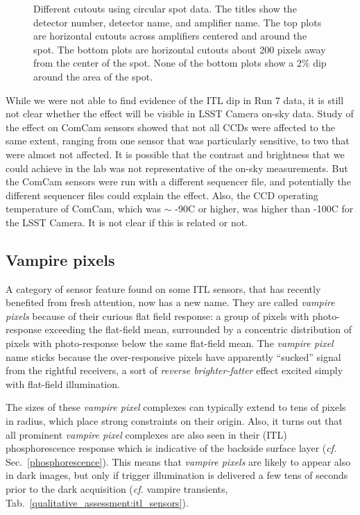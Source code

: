 \begin{figure}[ht]
\caption{Different cutouts using circular spot data. The titles show the detector number, detector name, and amplifier name. The top plots are horizontal cutouts across amplifiers centered and around the spot. The bottom plots are horizontal cutouts about 200 pixels away from the center of the spot. None of the bottom plots show a 2\% dip around the area of the spot.}
\label{fig:ITLDip_Spots}
\end{figure}

While we were not able to find evidence of the ITL dip in Run 7 data, it
is still not clear whether the effect will be visible in LSST Camera on-sky data. 
Study of the effect on ComCam sensors showed that not all CCDs were affected to the same extent, ranging from one sensor that was particularly sensitive, to two that were almost not affected. 
It is possible that the contrast and brightness that we could achieve in the lab was not representative of the on-sky measurements. But the ComCam sensors were run with a different sequencer file, and potentially the different sequencer files could explain the effect. Also, the CCD operating temperature of ComCam, which was $\sim$ -90C or higher, was higher than -100C for the LSST Camera. It is not clear if this is related or not.

\clearpage

\subsection{Vampire pixels}\label{vampire-pixels}

A category of sensor feature found on some ITL sensors, that has recently benefited from fresh attention, now has a new name. They are called {\it vampire pixels} because of their curious flat field response: a group of pixels with photo-response exceeding the flat-field mean, surrounded by a concentric distribution of pixels with photo-response below the same flat-field mean. The {\it vampire pixel} name sticks because the over-responsive pixels have apparently ``sucked'' signal from the rightful receivers, a sort of {\it reverse brighter-fatter} effect excited simply with flat-field illumination. 

The sizes of these {\it vampire pixel} complexes can typically extend to tens of pixels in radius, which place strong constraints on their origin. Also, it turns out that all prominent {\it vampire pixel} complexes are also seen in their (ITL) phosphorescence response which is indicative of the backside surface layer ({\it cf.} Sec.~\ref{phosphorescence}). This means that {\it vampire pixels} are likely to appear also in dark images, but only if trigger illumination is delivered a few tens of seconds prior to the dark acquisition ({\it cf.} vampire transients, Tab.~\ref{qualitative_assessment:itl_sensors}).


